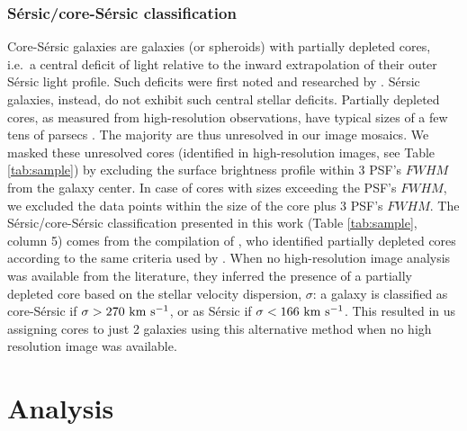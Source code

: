 \documentclass[preprint2]{emulateapj}
\begin{document}
\subsubsection{S\'ersic/core-S\'ersic classification}
\label{sec:corser}
Core-S\'ersic galaxies \citep{grahamguzman2003,graham2003coresersicmodel,trujillo2004coresersicmodel} are galaxies (or spheroids) 
with partially depleted cores, 
i.e.~a central deficit of light relative to the inward extrapolation of their outer S\'ersic light profile. 
Such deficits were first noted and researched by \cite{kingminkowski1966}.
S\'ersic galaxies, instead, do not exhibit such central stellar deficits.
Partially depleted cores, as measured from high-resolution observations, have typical sizes of a few tens of parsecs
\citep{dullograham2014cores,rusli2013}.
The majority are thus unresolved in our image mosaics. 
We masked these unresolved cores (identified in high-resolution images, see Table \ref{tab:sample}) by excluding the surface brightness profile 
within 3 PSF's $FWHM$ from the galaxy center.
In case of cores with sizes exceeding the PSF's $FWHM$, we excluded the data points within the size of the core 
plus 3 PSF's $FWHM$.
The S\'ersic/core-S\'ersic classification presented in this work (Table \ref{tab:sample}, column 5)
comes from the compilation of \citet{savorgnangraham2015},
who identified partially depleted cores according to the same criteria used by \citet{grahamscott2013}.
When no high-resolution image analysis was available from the literature, 
they inferred the presence of a partially depleted core based on the stellar velocity dispersion, $\sigma$:
a galaxy is classified as core-S\'ersic if $\sigma > 270\rm~km~s^{-1}$,
or as S\'ersic if $\sigma < 166\rm~km~s^{-1}$.
This resulted in us assigning cores to just 2 galaxies using this alternative method when 
no high resolution image was available.

\section{Analysis}
\label{sec:anal}
\end{document}
